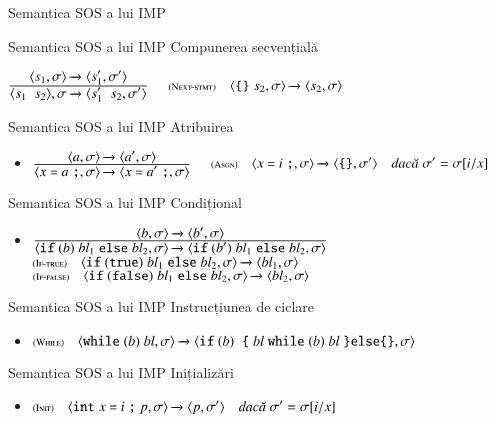 \documentclass[xcolor=pdftex,romanian,colorlinks]{beamer}
\begin{document}
\begin{section}{Semantica SOS a lui IMP}
  \begin{frame}{Semantica SOS a lui IMP}
  {Compunerea secvențială}
  \begin{itemize}
  \vitem[] $\reg{\Ss{\c{s_1 \terminal{} s_2},\sigma}{\c{s_1' \terminal{} s_2,\sigma'}}}{\Ss{\c{s_1,\sigma}}{\c{s_1',\sigma'}}}{}$
  \vitem[] $\reg[Next-stmt]{\Ss{\c{\terminal{\{\}} \terminal{} s_2,\sigma}}{\c{s_2,\sigma}}}{}{}$
  \end{itemize}
  \end{frame}

  \begin{frame}{Semantica SOS a lui IMP}
  {Atribuirea}
  \begin{itemize}
  \item[] $\reg{\Ss{\c{x \terminal{=} a \terminal{;},\sigma}}{\c{x \terminal{=} a' \terminal{;},\sigma}}}{\Ss{\c{a,\sigma}}{\c{a',\sigma}}}{}$
  \vitem[] $\reg[Asgn]{\Ss{\c{x \terminal{=} i \terminal{;},\sigma}}{\c{\terminal{\{\}},\sigma'}}}{}{\sigma'=\sigma[i/x]}$
  \end{itemize}
  \end{frame}

  \begin{frame}{Semantica SOS a lui IMP}
  {Condițional}
  \begin{itemize}
  \item[]
  $\reg{
   \Ss{\c{\Sif ({b})\; {\it bl}_1 \Selse {\it bl}_2,\sigma}}{\c{\Sif ({b'})\; {\it bl}_1 \Selse {\it bl}_2,\sigma}}
  }{
    \Ss{\c{b,\sigma}}{\c{b',\sigma}}
  }
  {}$
  \vitem[]
  $\reg[If-true]{\Ss{\c{\Sif (\terminal{true})\; {\it bl}_1 \Selse {\it bl}_2,\sigma}}{\c{{\it bl}_1,\sigma}}}{}{}$
  \vitem[]
  $\reg[If-false]{\Ss{\c{\Sif (\terminal{false})\; {\it bl}_1 \Selse {\it bl}_2,\sigma}}{\c{{\it bl}_2,\sigma}}}{}{}$

  \end{itemize}
  \end{frame}

  \begin{frame}{Semantica SOS a lui IMP}
  {Instrucțiunea de ciclare}
  \begin{itemize}
  \item[]
  $\reg[While]{
   \Ss{\c{\Swhile ({b})\; {\it bl},\sigma}}{\c{\Sif ({b})\; \terminal{\{} {\it bl}\terminal{} \Swhile ({b})\; {\it bl} \terminal{\}} \Selse \terminal{\{\}},\sigma}}
  }{}
  {}$
  \end{itemize}
  \end{frame}

  \begin{frame}{Semantica SOS a lui IMP}
  {Inițializări}
  \begin{itemize}
  \item[] $\reg[Init]{\Ss{\c{\terminal{int} x \terminal{=} i \terminal{;} p,\sigma}}{\c{p,\sigma'}}}{}{\sigma'=\sigma[i/x]}$
  \end{itemize}
  \end{frame}


\end{section}
\end{document}
